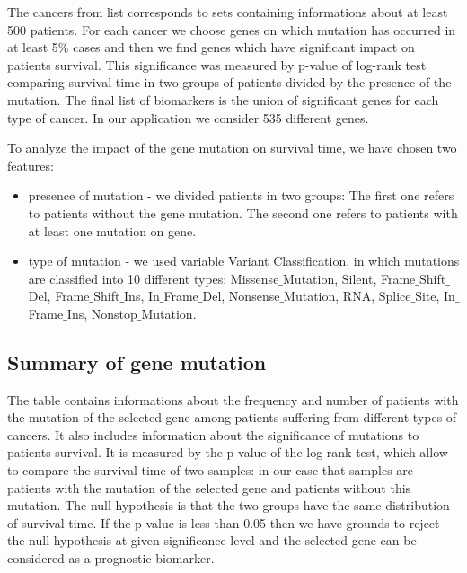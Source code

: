 The cancers from list corresponds to sets containing informations about at
least 500 patients. For each cancer we choose genes on which mutation
has occurred in at least 5\% cases and then we find genes which have
significant impact on patients survival. This significance was measured
by p-value of log-rank test comparing survival time in two groups of
patients divided by the presence of the mutation. The final list of
biomarkers is the union of significant genes for each type of cancer. In
our application we consider 535 different genes.

To analyze the impact of the gene mutation on survival time, we have
chosen two features:

\begin{itemize}
\itemsep1pt\parskip0pt
\item
  presence of mutation - we divided patients in two groups: The first
  one refers to patients without the gene mutation. The second one
  refers to patients with at least one mutation on gene.
\item
  type of mutation - we used variable Variant Classification, in which
  mutations are classified into 10 different types:
  Missense\(\_\)Mutation, Silent, Frame\(\_\)Shift\(\_\)Del,
  Frame\(\_\)Shift\(\_\)Ins, In\(\_\)Frame\(\_\)Del,
  Nonsense\(\_\)Mutation, RNA, Splice\(\_\)Site, In\(\_\)Frame\(\_\)Ins,
  Nonstop\(\_\)Mutation.
\end{itemize}



\subsection{Summary of gene mutation}\label{summary-of-gene-mutation}

The table contains informations about the frequency and number of
patients with the mutation of the selected gene among patients suffering
from different types of cancers. It also includes information about the
significance of mutations to patients survival. It is measured by the
p-value of the log-rank test, which allow to compare the survival time
of two samples: in our case that samples are patients with the mutation
of the selected gene and patients without this mutation. The null
hypothesis is that the two groups have the same distribution of
survival time. If the p-value is less than 0.05 then we have grounds to
reject the null hypothesis at given significance level and the selected
gene can be considered as a prognostic biomarker.

